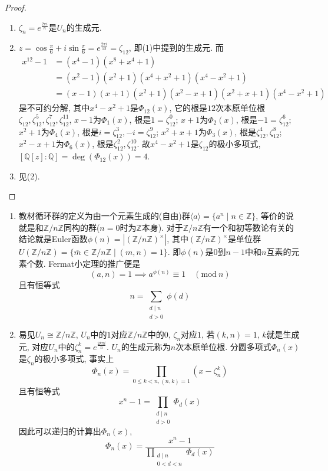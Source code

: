 \documentclass{../solutions-cn}
\begin{document}
\begin{proof}
    \begin{enumerate}[(1)]
        \item $\zeta_n = e^{\frac{2\pi i}{n}}$是$U_n$的生成元.
        \item $z = \cos \frac\pi6 + i\sin \frac\pi6 = e^\frac{2\pi i}{12} = \zeta_{12}$, 即(1)中提到的生成元. 而
        \[
        \begin{aligned}
            x^{12} - 1 &= (x^4 - 1)(x^8 + x^4 + 1)\\
            &= (x^2 - 1)(x^2 + 1)(x^4 + x^2 + 1)(x^4 - x^2 + 1)\\
            &= (x - 1)(x + 1)(x^2 + 1)(x^2 - x + 1)(x^2 + x + 1)(x^4 - x^2 + 1)
        \end{aligned}
        \]
        是不可约分解, 其中$x^4 - x^2 + 1$是$\Phi_{12}(x)$, 它的根是$12$次本原单位根$\zeta_{12}, \zeta_{12}^5, \zeta_{12}^7, \zeta_{12}^{11}$, $x - 1$为$\Phi_1(x)$, 根是$1 = \zeta_{12}^0$; $x + 1$为$\Phi_2(x)$, 根是$-1 = \zeta_{12}^6$; $x^2 + 1$为$\Phi_4(x)$, 根是$i = \zeta_{12}^3, -i = \zeta_{12}^9$; $x^2 + x + 1$为$\Phi_3(x)$, 根是$\zeta_{12}^4, \zeta_{12}^8$; $x^2 - x + 1$为$\Phi_6(x)$, 根是$\zeta_{12}^2, \zeta_{12}^{10}$. 故$x^4 - x^2 + 1$是$\zeta_{12}$的极小多项式, $[\mathbb{Q}[z]:\mathbb{Q}] = \deg(\Phi_{12}(x)) = 4$. 
        \item 见(2).
    \end{enumerate}
\end{proof}

\begin{remark}
    \begin{enumerate}[1.]
        \item 教材循环群的定义为由一个元素生成的(自由)群$\langle a \rangle = \{a^n \mid n \in \mathbb{Z}\}$, 等价的说就是和$\mathbb{Z}/n\mathbb{Z}$同构的群($n = 0$时为$\mathbb{Z}$本身). 对于$\mathbb{Z}/n\mathbb{Z}$有一个和初等数论有关的结论就是Euler函数$\phi(n) = |(\mathbb{Z}/n\mathbb{Z})^\times|$, 其中$(\mathbb{Z}/n\mathbb{Z})^\times$是单位群$U(\mathbb{Z}/n\mathbb{Z}) = \{\overline{m} \in \mathbb{Z}/n\mathbb{Z} \mid (m, n) = 1\}$. 即$\phi(n)$是$0$到$n - 1$中和$n$互素的元素个数. Fermat小定理的推广便是
        \[
            (a, n) = 1 \implies a^{\phi(n)} \equiv 1 \quad (\mathrm{mod}~n)
        \]
        且有恒等式
        \[
            n = \sum_{\substack{d \mid n\\d > 0}} \phi(d)
        \]
        \item 易见$U_n \cong \mathbb{Z}/n\mathbb{Z}$, $U_n$中的$1$对应$\mathbb{Z}/n\mathbb{Z}$中的$0$, $\zeta_n$对应$1$, 若$(k, n) = 1$, $k$就是生成元, 对应$U_n$中的$\zeta_n^k = e^{\frac{2k\pi i}{n}}$. $U_n$的生成元称为$n$次本原单位根. 分圆多项式$\Phi_n(x)$是$\zeta_n$的极小多项式, 事实上
        \[
            \Phi_n(x) = \prod_{0 \leqslant k < n, (n, k) = 1} (x - \zeta_n^k)
        \]
        且有恒等式
        \[
            x^n - 1 = \prod_{\substack{d \mid n\\d > 0}} \Phi_d(x)
        \]
        因此可以递归的计算出$\Phi_n(x)$,
        \[
            \Phi_n(x) = \frac{x^n - 1}{\displaystyle\prod_{\substack{d \mid n\\0 < d < n}} \Phi_d(x)} 
        \]
    \end{enumerate}    
\end{remark}
\end{document}
